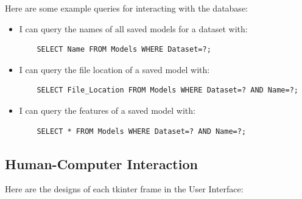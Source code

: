 \documentclass[./project-report/src/latex/project-report.tex]{subfiles}
\begin{document}
Here are some example queries for interacting with the database:

\begin{itemize}
    \item I can query the names of all saved models for a dataset with:
    \begin{verbatim}
    SELECT Name FROM Models WHERE Dataset=?;
    \end{verbatim}
    \item I can query the file location of a saved model with:
    \begin{verbatim}
    SELECT File_Location FROM Models WHERE Dataset=? AND Name=?;
    \end{verbatim}
    \item I can query the features of a saved model with:
    \begin{verbatim}
    SELECT * FROM Models WHERE Dataset=? AND Name=?;
    \end{verbatim}
\end{itemize}

\subsection{Human-Computer Interaction}

Here are the designs of each tkinter frame in the User Interface:
\end{document}
